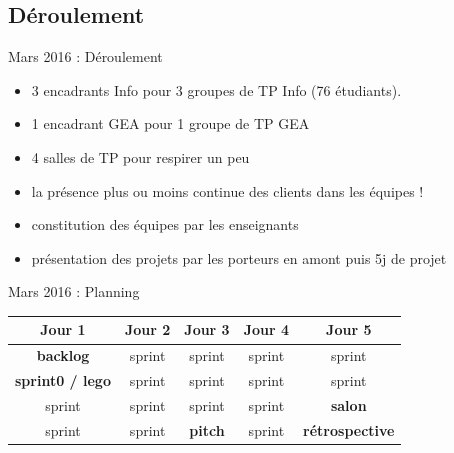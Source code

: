 \documentclass{beamer}
\begin{document}
\subsection{Déroulement}
\begin{frame}{Mars 2016 : Déroulement}
  \begin{itemize}
    \item 3 encadrants Info pour 3 groupes de TP Info (76 étudiants).
    \item 1 encadrant GEA pour 1 groupe de TP GEA
    \item 4 salles de TP pour respirer un peu
    \item la présence plus ou moins continue des clients dans les équipes !
    \item constitution des équipes par les enseignants
    \item présentation des projets par les porteurs en amont puis 5j de projet
  \end{itemize}
\end{frame}

\begin{frame}{Mars 2016 : Planning}
  \begin{center}
    \begin{tabular}{| c | c | c || c | c |}
      \hline
      \textbf{Jour 1} & \textbf{Jour 2} & \textbf{Jour 3} & \textbf{Jour 4} & \textbf{Jour 5} \\
      \hline \hline
      \textbf{backlog}  & sprint          & sprint          & sprint          & sprint          \\
      \hline
      \textbf{sprint0 / lego}  & sprint          & sprint          & sprint          & sprint          \\
      \hline \hline
      sprint          & sprint          & sprint          & sprint          & \textbf{salon}           \\
      \hline
      sprint          & sprint          & \textbf{pitch}           & sprint          & \textbf{rétrospective}   \\
      \hline
    \end{tabular}
  \end{center}
\end{frame}
\end{document}
